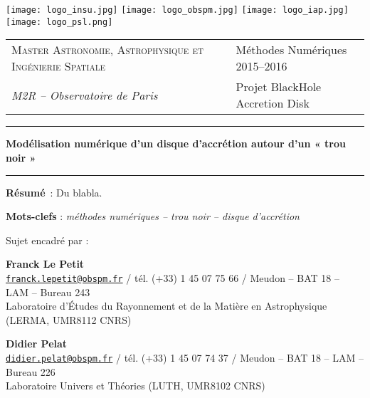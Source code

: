 \thispagestyle{empty}

\texttt{[image: logo\_insu.jpg]} \hfill
\texttt{[image: logo\_obspm.jpg]} \hfill
\texttt{[image: logo\_iap.jpg]} \hfill
\texttt{[image: logo\_psl.png]}
 
\vspace{0.5cm}

\begin{tabularx}{\textwidth}{@{} l X l @{} }
\textsc{Master Astronomie, Astrophysique et Ingénierie Spatiale} & & Méthodes Numériques 2015–2016 \\
\textit{M2R – Observatoire de Paris} & & Projet BlackHole Accretion Disk
\end{tabularx}
 
\begin{center}
 
\vspace{1.5cm}
 
\rule[11pt]{5cm}{0.5pt}
 
\textbf{\huge Modélisation numérique d’un disque d’accrétion autour d’un « trou noir »}

\rule{5cm}{0.5pt}

\vspace{1.5cm}

\parbox{15cm}{\textbf{Résumé} : Du blabla.
} %

\vspace{0.5cm}

\parbox{15cm}{
\textbf{Mots-clefs} : \it méthodes numériques – trou noir – disque d’accrétion
} %

\vspace{0.5cm}

\parbox{15cm}{
Sujet encadré par :

\textbf{Franck Le Petit} \\
\href{mailto:franck.lepetit@obspm.fr}
{\tt franck.lepetit@obspm.fr} / tél. (+33) 1 45 07 75 66 / Meudon – BAT 18 – LAM – Bureau 243 \\
Laboratoire d’Études du Rayonnement et de la Matière en Astrophysique (LERMA, UMR8112 CNRS)

\textbf{Didier Pelat} \\
\href{mailto:didier.pelat@obspm.fr}
{\tt didier.pelat@obspm.fr} / tél. (+33) 1 45 07 74 37 / Meudon – BAT 18 – LAM – Bureau 226 \\
Laboratoire Univers et Théories (LUTH, UMR8102 CNRS)

}
\end{center}
